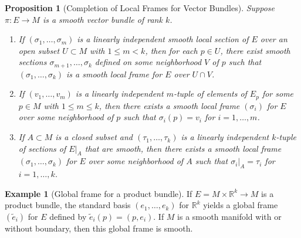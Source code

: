 \documentclass[reqno]{amsart}
\newtheorem{proposition}[theorem]{Proposition}
\theoremstyle{definition}
\newtheorem{example}[theorem]{Example}
\theoremstyle{remark}
\begin{document}
    \begin{proposition}[Completion of Local Frames for
        Vector Bundles]
        Suppose $\pi \colon E \to M$ is a smooth
        vector bundle of rank $k$.
        \begin{enumerate}
            \item If $\left( \sigma_1, \ldots,
                \sigma_m \right) $ is a linearly independent
                smooth local section of $E$ over an open
                subset $U \subset M$ with
                $1 \le m <k$, then for each $p \in U$,
                there exist smooth sections
                $\sigma_{m+1}, \ldots, \sigma_k$ defined
                on some neighborhood $V$ of $p$ such that
                $\left( \sigma_1, \ldots, \sigma_k \right) $ 
                is a smooth local frame for $E$ over
                $U \cap V$.
            \item If $\left( v_1, \ldots, v_m \right) $ is
                a linearly independent
                $m$-tuple of elements of
                $E_p$ for some $p \in M$ with
                $1 \le m \le k$, then there exists
                a smooth local frame
                $\left( \sigma_i \right) $ for
                $E$ over some neighborhood of $p$ such that
                $\sigma_i (p) = v_i$ for $i = 1,\ldots,m$.
            \item If $A \subset M$ is a closed subset
                and $\left( \tau_1, \ldots, \tau_k \right) $ 
                is a linearly independent $k$-tuple
                of sections of $E|_A$ that are smooth, then
                there exists a smooth local frame
                $\left( \sigma_1, \ldots, \sigma_k \right) $ 
                for $E$ over some neighborhood
                of $A$ such that
                $\sigma_i|_A = \tau_i$ for
                 $i = 1,\ldots,k$.
        \end{enumerate}
    \end{proposition}

    \begin{example}[Global frame for a product bundle]
        If $E = M \times \mathbb{R}^{k} \to M$ is a product
        bundle, the standard basis
        $\left( e_1, \ldots, e_k \right) $ for $\mathbb{R}^{k}$
        yields a global frame $\left( \tilde{e}_i \right) $ 
        for $E$ defined by
        $\tilde{e}_i (p) = \left( p, e_i \right) $.
        If $M$ is a smooth manifold with or without
        boundary, then this global frame is smooth.
    \end{example}
\end{document}
